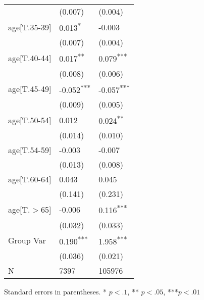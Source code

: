 \begin{table}
\begin{center}
\begin{tabular}{lll}
                                  & (0.007)   & (0.004)      \\
age[T.35-39]                      & \cellcolor{green!25}0.013\textsuperscript{*}    & -0.003       \\
                                  & (0.007)   & (0.004)      \\
age[T.40-44]                      & \cellcolor{green!25}0.017\textsuperscript{**}   & \cellcolor{green!25}0.079\textsuperscript{***}     \\
                                  & (0.008)   & (0.006)      \\
age[T.45-49]                      & \cellcolor{red!25}-0.052\textsuperscript{***}   & \cellcolor{red!25}-0.057\textsuperscript{***}    \\
                                  & (0.009)   & (0.005)      \\
age[T.50-54]                      & 0.012     & \cellcolor{green!25}0.024\textsuperscript{**}      \\
                                  & (0.014)   & (0.010)      \\
age[T.54-59]                      & -0.003    & -0.007       \\
                                  & (0.013)   & (0.008)      \\
age[T.60-64]                      & 0.043     & 0.045        \\
                                  & (0.141)   & (0.231)      \\
age[T.$>$65]                      & -0.006    & \cellcolor{green!25}0.116\textsuperscript{***}     \\
                                  & (0.032)   & (0.033)      \\
Group Var                         & 0.190\textsuperscript{***}  & 1.958\textsuperscript{***}     \\
                                  & (0.036)   & (0.021)      \\
N                                 & 7397 & 105976  \\
\hline
\end{tabular}
\newline{}
Standard errors in parentheses.
* $p<.1$, ** $p<.05$, ***$p<.01$
\end{center}
\end{table}

\bigskip
